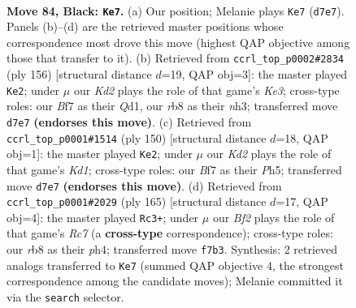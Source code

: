 \documentclass[11pt]{article}
\begin{document}
\clearpage

\begin{figure}[p]\centering
\begin{subfigure}{0.46\textwidth}\centering
\resizebox{\linewidth}{!}{%
\newchessgame
\chessboard[
  setfen={1R6/3k1br1/8/2R5/1P1K4/8/8/8 b - - 42 84},
  showmover=false,
  pgfstyle=straightmove, color=movearrow, markmove={d7-e7}
]}
\caption{}
\end{subfigure}\hfill
\begin{subfigure}{0.46\textwidth}\centering
\resizebox{\linewidth}{!}{%
\newchessgame
\chessboard[
  setfen={8/8/6pk/5r2/8/4K2n/8/3Q4 w - - 5 79},
  showmover=false,
  pgfstyle=straightmove, color=movearrow, markmove={e3-e2}
]}
\caption{}
\end{subfigure}
\\[4pt]
\begin{subfigure}{0.46\textwidth}\centering
\resizebox{\linewidth}{!}{%
\newchessgame
\chessboard[
  setfen={8/R7/8/5kpP/5r2/8/8/3K4 w - - 18 76},
  showmover=false,
  pgfstyle=straightmove, color=movearrow, markmove={d1-e2}
]}
\caption{}
\end{subfigure}\hfill
\begin{subfigure}{0.46\textwidth}\centering
\resizebox{\linewidth}{!}{%
\newchessgame
\chessboard[
  setfen={8/7p/5k2/8/6RP/7K/2r5/8 b - - 4 83},
  showmover=false,
  pgfstyle=straightmove, color=movearrow, markmove={c2-c3}
]}
\caption{}
\end{subfigure}
\caption{\textbf{Move 84, Black: \texttt{Ke7}.} (a) Our position; Melanie plays \texttt{Ke7} (\texttt{d7e7}). Panels (b)--(d) are the retrieved master positions whose correspondence most drove this move (highest QAP objective among those that transfer to it). (b) Retrieved from \texttt{ccrl\_top\_p0002\#2834} (ply 156) [structural distance $d$=19, QAP obj=3]: the master played \texttt{Ke2}; under $\mu$ our \emph{Kd2} plays the role of that game's \emph{Ke3}; cross-type roles: our \emph{B}f7 as their \emph{Q}d1, our \emph{r}b8 as their \emph{n}h3; transferred move \texttt{d7e7} \textbf{(endorses this move)}. (c) Retrieved from \texttt{ccrl\_top\_p0001\#1514} (ply 150) [structural distance $d$=18, QAP obj=1]: the master played \texttt{Ke2}; under $\mu$ our \emph{Kd2} plays the role of that game's \emph{Kd1}; cross-type roles: our \emph{B}f7 as their \emph{P}h5; transferred move \texttt{d7e7} \textbf{(endorses this move)}. (d) Retrieved from \texttt{ccrl\_top\_p0001\#2029} (ply 165) [structural distance $d$=17, QAP obj=4]: the master played \texttt{Rc3+}; under $\mu$ our \emph{Bf2} plays the role of that game's \emph{Rc7} (a \textbf{cross-type} correspondence); cross-type roles: our \emph{r}b8 as their \emph{p}h4; transferred move \texttt{f7b3}. Synthesis: 2 retrieved analogs transferred to \texttt{Ke7} (summed QAP objective 4, the strongest correspondence among the candidate moves); Melanie committed it via the \texttt{search} selector.}
\label{fig:thought-m167}
\end{figure}
\end{document}
